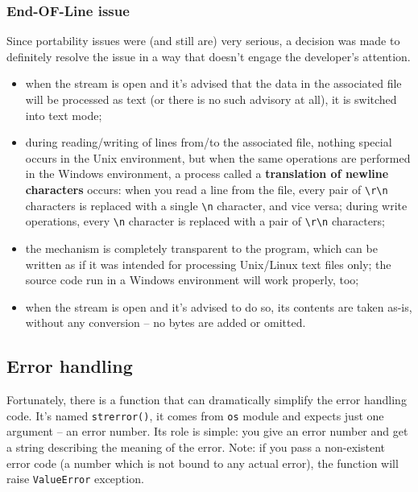 \documentclass[11pt]{article}
\begin{document}
\subsubsection{End-OF-Line issue}
\label{sec:org5d1ed6d}
Since portability issues were (and still are) very serious, a decision
was made to definitely resolve the issue in a way that doesn’t engage
the developer’s attention.

\begin{itemize}
\item when the stream is open and it’s advised that the data in the
associated file will be processed as text (or there is no such
advisory at all), it is switched into text mode;

\item during reading/writing of lines from/to the associated file, nothing
special occurs in the Unix environment, but when the same operations
are performed in the Windows environment, a process called a
\textbf{translation of newline characters} occurs: when you read a line from
the file, every pair of \texttt{\textbackslash{}r\textbackslash{}n} characters is replaced with a single \texttt{\textbackslash{}n}
character, and vice versa; during write operations, every \texttt{\textbackslash{}n}
character is replaced with a pair of \texttt{\textbackslash{}r\textbackslash{}n} characters;

\item the mechanism is completely transparent to the program, which can be
written as if it was intended for processing Unix/Linux text files
only; the source code run in a Windows environment will work
properly, too;

\item when the stream is open and it’s advised to do so, its contents are
taken as-is, without any conversion – no bytes are added or omitted.
\end{itemize}




\newpage

\subsection{Error handling}
\label{sec:org097f9f5}
Fortunately, there is a function that can dramatically simplify the
error handling code. It’s named \texttt{strerror()}, it comes from \texttt{os} module
and expects just one argument – an error number.  Its role is simple:
you give an error number and get a string describing the meaning of
the error.  Note: if you pass a non-existent error code (a number
which is not bound to any actual error), the function will raise
\texttt{ValueError} exception.
\end{document}
